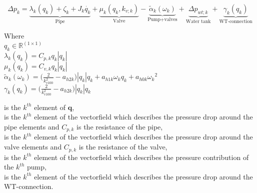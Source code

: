 
\begin{equation}
\label{CompleteModel_extended}
\Delta p_k = \underbrace{\lambda_k (q_k) + \zeta_k + J_k \dot{q_k}}_\text{Pipe} + \underbrace{\mu_k (q_k, k_{v;k})}_\text{Valve} - \underbrace{\tilde{\alpha}_k(\omega_k)}_\text{Pump+valves} + \underbrace{\Delta p_{wt;k}}_\text{Water tank} + \underbrace{\gamma_k (q_k)}_\text{WT-connection}
\end{equation}

\begin{minipage}[t]{0.20\textwidth}
Where\\
\hspace*{8mm} $q_k \in \mathbb{R}^{(1 \times 1)} $ \\
\hspace*{8mm} $\lambda_k (q_k) = C_{p,k} q_k |q_k| $ \\
\hspace*{8mm} $\mu_k (q_k) = C_{v,k} q_k |q_k| $ \\
\hspace*{8mm} $\tilde{\alpha}_k(\omega_k) = \Big(\frac{2}{k_{v100}^2} - a_{h2k}\Big)|q_k| q_k  + a_{h1k} \omega_{k} q_k + a_{h0k}{\omega_k}^2$  \\
\hspace*{8mm} $\gamma_k (q_k) = \Big(\frac{2}{k_{v100}^2} - a_{h2k}\Big)|q_k| q_k $ 
\end{minipage}
\begin{minipage}[t]{0.68\textwidth}
\vspace*{2mm}
\hspace*{4mm} is the $k^{th}$ element of $\bm{q}$, \\
\hspace*{4mm} is the $k^{th}$ element of the vectorfield which describes the pressure drop around the pipe elements and $C_{p,k}$ is the resistance of the pipe, \\
\hspace*{4mm} is the $k^{th}$ element of the vectorfield which describes the pressure drop around the valve elements and $C_{p,k}$ is the resistance of the valve, \\
\hspace*{4mm} is the $k^{th}$ element of the vectorfield which describes the pressure contribution of the $k^{th}$ pump, \\
\hspace*{4mm} is the $k^{th}$ element of the vectorfield which describes the pressure drop around the WT-connection.  
\end{minipage}

